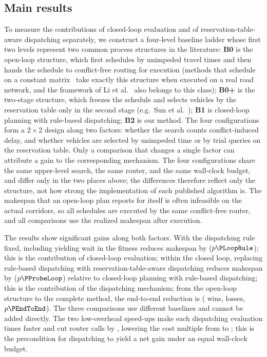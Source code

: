 \subsection{Main results}

To measure the contributions of closed-loop evaluation and of reservation-table-aware dispatching separately, we construct a four-level baseline ladder whose first two levels represent two common process structures in the literature: \textbf{B0} is the open-loop structure, which first schedules by unimpeded travel times and then hands the schedule to conflict-free routing for execution (methods that schedule on a constant matrix~\cite{meng2025cp,qin2026knowledge,fu2025integrated} take exactly this structure when executed on a real road network, and the framework of Li et al.~\cite{li2026framework} also belongs to this class); \textbf{B0+} is the two-stage structure, which freezes the schedule and selects vehicles by the reservation table only in the second stage (e.g.\ Sun et al.~\cite{sun2023integrated});
\textbf{B1} is closed-loop planning with rule-based dispatching; \textbf{B2} is our method. The four configurations form a $2\times2$ design along two factors: whether the search counts conflict-induced delay, and whether vehicles are selected by unimpeded time or by trial queries on the reservation table.
Only a comparison that changes a single factor can attribute a gain to the corresponding mechanism.
The four configurations share the same upper-level search, the same router, and the same wall-clock budget, and differ only in the two places above; the differences therefore reflect only the structure, not how strong the implementation of each published algorithm is.
The makespan that an open-loop plan reports for itself is often infeasible on the actual corridors, so all schedules are executed by the same conflict-free router, and all comparisons use the realized makespan after execution.

The results show significant gains along both factors. With the dispatching rule fixed, including yielding wait in the fitness reduces makespan by \GainLoopRule{} ($p\PLoopRule$); this is the contribution of closed-loop evaluation;
within the closed loop, replacing rule-based dispatching with reservation-table-aware dispatching reduces makespan by \GainProbeLoop{} ($p\PProbeLoop$) relative to closed-loop planning with rule-based dispatching; this is the contribution of the dispatching mechanism;
from the open-loop structure to the complete method, the end-to-end reduction is \GainEndToEnd{} (\WinEndToEnd{} wins, \LoseEndToEnd{} losses, $p\PEndToEnd$). The three comparisons use different baselines and cannot be added directly.
The two low-overhead speed-ups make each dispatching evaluation \SpeedupProbe{} times faster and cut router calls by \RouteCallCut{}, lowering the cost multiple from \CostMultBefore{} to \CostMultAfter{}; this is the precondition for dispatching to yield a net gain under an equal wall-clock budget.

